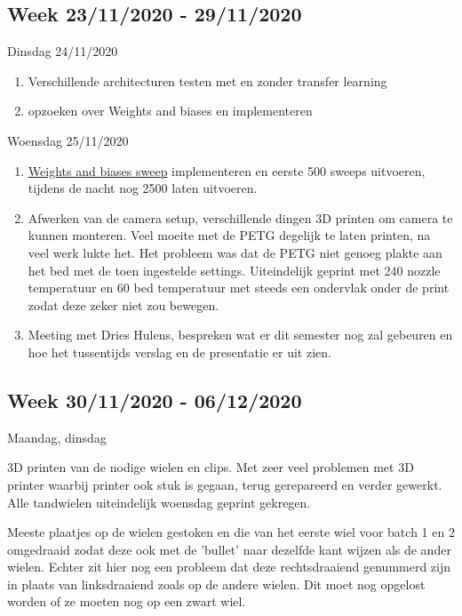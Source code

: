 \documentclass{scrartcl}
\begin{document}
\subsection{Week 23/11/2020 - 29/11/2020}

Dinsdag 24/11/2020

\begin{enumerate}[1]
\item Verschillende architecturen testen met en zonder transfer learning
\item opzoeken over Weights and biases en implementeren
\end{enumerate}


Woensdag 25/11/2020

\begin{enumerate}[1]
\item \href{https://wandb.ai/dplars/pytorch-twi_second_handmade_sweep?workspace=user-dplars}{Weights and biases sweep} implementeren en eerste 500 sweeps uitvoeren, tijdens de nacht nog 2500 laten uitvoeren.
\item Afwerken van de camera setup, verschillende dingen 3D printen om camera te kunnen monteren. Veel moeite met de PETG degelijk te laten printen, na veel werk lukte het. Het probleem was dat de PETG niet genoeg plakte aan het bed met de toen ingestelde settings. Uiteindelijk geprint met 240 nozzle temperatuur en 60 bed temperatuur met steeds een ondervlak onder de print zodat deze zeker niet zou bewegen.
\item Meeting met Dries Hulens, bespreken wat er dit semester nog zal gebeuren en hoe het tussentijds verslag en de presentatie er uit zien. 
\end{enumerate}


\subsection{Week 30/11/2020 - 06/12/2020}

Maandag, dinsdag

3D printen van de nodige wielen en clips. Met zeer veel problemen met 3D printer waarbij printer ook stuk is gegaan, terug gerepareerd en verder gewerkt. Alle tandwielen uiteindelijk woensdag geprint gekregen. 

Meeste plaatjes op de wielen gestoken en die van het eerste wiel voor batch 1 en 2 omgedraaid zodat deze ook met de 'bullet' naar dezelfde kant wijzen als de ander wielen. Echter zit hier nog een probleem dat deze rechtsdraaiend genummerd zijn in plaats van linksdraaiend zoals op de andere wielen. Dit moet nog opgelost worden of ze moeten nog op een zwart wiel.
\end{document}
